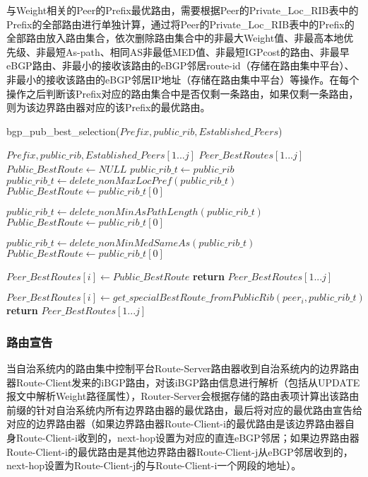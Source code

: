 与Weight相关的Peer的Prefix最优路由，需要根据Peer的Private\_Loc\_RIB表中的Prefix的全部路由进行单独计算，通过将Peer的Private\_Loc\_RIB表中的Prefix的全部路由放入路由集合，依次删除路由集合中的非最大Weight值、非最高本地优先级、非最短As-path、相同AS非最低MED值、非最短IGPcost的路由、非最早eBGP路由、非最小的接收该路由的eBGP邻居route-id（存储在路由集中平台）、非最小的接收该路由的eBGP邻居IP地址（存储在路由集中平台）等操作。在每个操作之后判断该Prefix对应的路由集合中是否仅剩一条路由，如果仅剩一条路由，则为该边界路由器对应的该Prefix的最优路由。

\begin{algorithm}[!h]
    \caption{bgp\_pub\_best\_selection($Prefix, public\_rib, Established\_Peers$)}
    \label{alg:public_selection_one}
    \begin{algorithmic}[1]%
        \REQUIRE
        $Prefix, public\_rib, Established\_Peers[1...j]$
        \ENSURE
        $Peer\_BestRoutes[1...j]$
        \STATE $Public\_BestRoute \gets NULL$
        \STATE $public\_rib\_t \gets public\_rib$
        \STATE $public\_rib\_t \gets delete\_nonMaxLocPref(public\_rib\_t)$
        \STATE $Public\_BestRoute  \gets public\_rib\_t[0]$
        \ENDIF

        \STATE $public\_rib\_t \gets delete\_nonMinAsPathLength(public\_rib\_t)$
        \STATE $Public\_BestRoute  \gets public\_rib\_t[0]$
        \ENDIF

        \STATE $public\_rib\_t \gets delete\_nonMinMedSameAs(public\_rib\_t)$
        \STATE $Public\_BestRoute  \gets public\_rib\_t[0]$
        \ENDIF

        \STATE $Peer\_BestRoutes[i] \gets Public\_BestRoute $
        \ENDFOR
        \STATE \textbf{return} $Peer\_BestRoutes[1...j]$
        \ENDIF

        \STATE $Peer\_BestRoutes[i] \gets get\_specialBestRoute\_fromPublicRib(peer_i,public\_rib\_t)$
        \ENDFOR
        \STATE \textbf{return} $Peer\_BestRoutes[1...j]$
    \end{algorithmic}
\end{algorithm}





\subsubsection{路由宣告}
当自治系统内的路由集中控制平台Route-Server路由器收到自治系统内的边界路由器Route-Client发来的iBGP路由，对该iBGP路由信息进行解析（包括从UPDATE报文中解析Weight路径属性），Router-Server会根据存储的路由表项计算出该路由前缀的针对自治系统内所有边界路由器的最优路由，最后将对应的最优路由宣告给对应的边界路由器（如果边界路由器Route-Client-i的最优路由是该边界路由器自身Route-Client-i收到的，next-hop设置为对应的直连eBGP邻居；如果边界路由器Route-Client-i的最优路由是其他边界路由器Route-Client-j从eBGP邻居收到的，next-hop设置为Route-Client-j的与Route-Client-i一个网段的地址）。

